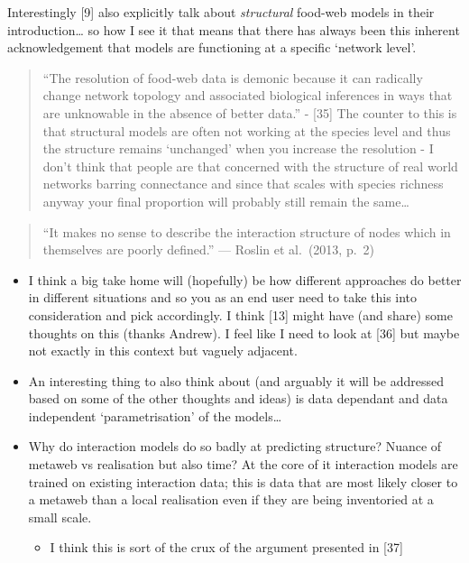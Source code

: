 \documentclass[
]{article}
\providecommand{\tightlist}{%
  \setlength{\itemsep}{0pt}\setlength{\parskip}{0pt}}\usepackage{longtable,booktabs,array}
\begin{document}
Interestingly {[}9{]} also explicitly talk about \emph{structural}
food-web models in their introduction\ldots{} so how I see it that means
that there has always been this inherent acknowledgement that models are
functioning at a specific `network level'.

\begin{quote}
``The resolution of food-web data is demonic because it can radically
change network topology and associated biological inferences in ways
that are unknowable in the absence of better data.'' - {[}35{]} The
counter to this is that structural models are often not working at the
species level and thus the structure remains `unchanged' when you
increase the resolution - I don't think that people are that concerned
with the structure of real world networks barring connectance and since
that scales with species richness anyway your final proportion will
probably still remain the same\ldots{}
\end{quote}

\begin{quote}
``It makes no sense to describe the interaction structure of nodes which
in themselves are poorly defined.'' --- Roslin et al.~(2013, p.~2)
\end{quote}

\begin{itemize}
\item
  I think a big take home will (hopefully) be how different approaches
  do better in different situations and so you as an end user need to
  take this into consideration and pick accordingly. I think {[}13{]}
  might have (and share) some thoughts on this (thanks Andrew). I feel
  like I need to look at {[}36{]} but maybe not exactly in this context
  but vaguely adjacent.
\item
  An interesting thing to also think about (and arguably it will be
  addressed based on some of the other thoughts and ideas) is data
  dependant and data independent `parametrisation' of the models\ldots{}
\item
  Why do interaction models do so badly at predicting structure? Nuance
  of metaweb vs realisation but also time? At the core of it interaction
  models are trained on existing interaction data; this is data that are
  most likely closer to a metaweb than a local realisation even if they
  are being inventoried at a small scale.

  \begin{itemize}
  \tightlist
  \item
    I think this is sort of the crux of the argument presented in
    {[}37{]}
  \end{itemize}
\end{itemize}
\end{document}
